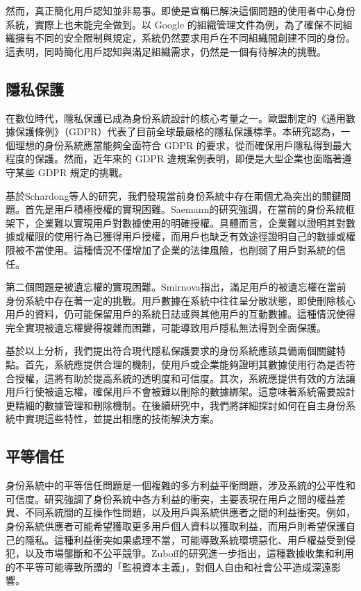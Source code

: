 然而，真正簡化用戶認知並非易事。即使是宣稱已解決這個問題的使用者中心身份系統，實際上也未能完全做到。以 Google 的組織管理文件\cite{gcp2024identity}為例，為了確保不同組織擁有不同的安全限制與規定，系統仍然要求用戶在不同組織間創建不同的身份。這表明，同時簡化用戶認知與滿足組織需求，仍然是一個有待解決的挑戰。
\subsection{隱私保護}
在數位時代，隱私保護已成為身份系統設計的核心考量之一。歐盟制定的《通用數據保護條例》（GDPR）\cite{GDPR2016}代表了目前全球最嚴格的隱私保護標準。本研究認為，一個理想的身份系統應當能夠全面符合 GDPR 的要求，從而確保用戶隱私得到最大程度的保護。然而，近年來的 GDPR 違規案例表明，即便是大型企業也面臨著遵守某些 GDPR 規定的挑戰。

基於Schardong等人的研究\cite{s22155641}，我們發現當前身份系統中存在兩個尤為突出的關鍵問題。首先是用戶積極授權的實現困難。Saemann\cite{saemann2022investigating}的研究強調，在當前的身份系統框架下，企業難以實現用戶對數據使用的明確授權。具體而言，企業難以證明其對數據或權限的使用行為已獲得用戶授權，而用戶也缺乏有效途徑證明自己的數據或權限被不當使用。這種情況不僅增加了企業的法律風險，也削弱了用戶對系統的信任。

第二個問題是被遺忘權的實現困難。Smirnova\cite{smirnova2024understanding}指出，滿足用戶的被遺忘權在當前身份系統中存在著一定的挑戰。用戶數據在系統中往往呈分散狀態，即使刪除核心用戶的資料，仍可能保留用戶的系統日誌或與其他用戶的互動數據。這種情況使得完全實現被遺忘權變得複雜而困難，可能導致用戶隱私無法得到全面保護。

基於以上分析，我們提出符合現代隱私保護要求的身份系統應該具備兩個關鍵特點。首先，系統應提供合理的機制，使用戶或企業能夠證明其數據使用行為是否符合授權，這將有助於提高系統的透明度和可信度。其次，系統應提供有效的方法讓用戶行使被遺忘權，確保用戶不會被難以刪除的數據綁架。這意味著系統需要設計更精細的數據管理和刪除機制。在後續研究中，我們將詳細探討如何在自主身份系統中實現這些特性，並提出相應的技術解決方案。
\subsection{平等信任}
身份系統中的平等信任問題是一個複雜的多方利益平衡問題，涉及系統的公平性和可信度。研究\cite{preukschat2021self}強調了身份系統中各方利益的衝突，主要表現在用戶之間的權益差異、不同系統間的互操作性問題，以及用戶與系統供應者之間的利益衝突。例如，身份系統供應者可能希望獲取更多用戶個人資料以獲取利益，而用戶則希望保護自己的隱私。這種利益衝突如果處理不當，可能導致系統環境惡化、用戶權益受到侵犯，以及市場壟斷和不公平競爭。Zuboff\cite{zhang2010security}的研究進一步指出，這種數據收集和利用的不平等可能導致所謂的「監視資本主義」，對個人自由和社會公平造成深遠影響。

